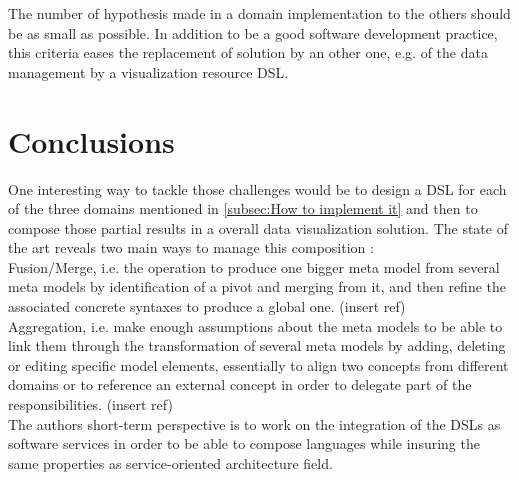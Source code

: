 \documentclass{acm_proc_article-sp}
\begin{document}
The number of hypothesis made in a domain implementation to the others
should be as small as possible. In addition to be a good software
development practice, this criteria eases the replacement of solution
by an other one, e.g. of the data management by a visualization
resource DSL.


\section{Conclusions}


One interesting way to tackle those challenges would be to design a
DSL for each of the three domains mentioned in \ref{subsec:How to
  implement it} and then to compose those partial results in a overall
data visualization solution.
The state of the art reveals two main ways to manage this composition :\\
 Fusion/Merge, i.e. the operation to produce one bigger meta
model from several meta models by identification of a pivot and
merging from it, and
then refine the associated concrete syntaxes to produce a global one. (insert ref)\\
 Aggregation, i.e. make enough assumptions about the meta models to be able to link them through the transformation of several meta models by adding, deleting or editing specific model elements, essentially to align two concepts from different domains or to reference an external concept in order to delegate part of the responsibilities. (insert ref)\\
The authors short-term perspective is to work on the integration of
the DSLs as software services in order to be able to compose languages
while insuring the same properties as service-oriented architecture
field.




%
\end{document}
